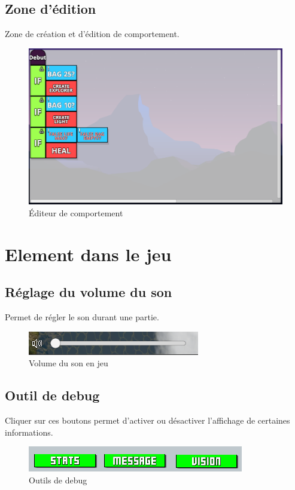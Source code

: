\documentclass{report}
\begin{document}
\subsection{Zone d'édition}
Zone de création et d’édition de comportement.
\begin{figure}[!h]
	\centering
		\includegraphics[scale=0.40]{Editeur}
	\caption{Éditeur de comportement}
\end{figure}


\section{Element dans le jeu}
\subsection{Réglage du volume du son}
Permet de régler le son durant une partie.
\begin{figure}[!h]
	\centering
		\includegraphics[scale=0.80]{SoundIG}
	\caption{Volume du son en jeu}
\end{figure}

\subsection{Outil de debug}
Cliquer sur ces boutons permet d'activer ou désactiver l'affichage de certaines informations.
\begin{figure}[!h]
	\centering
		\includegraphics[scale=0.80]{sebug.png}
	\caption{Outils de debug}
\end{figure}
\end{document}
